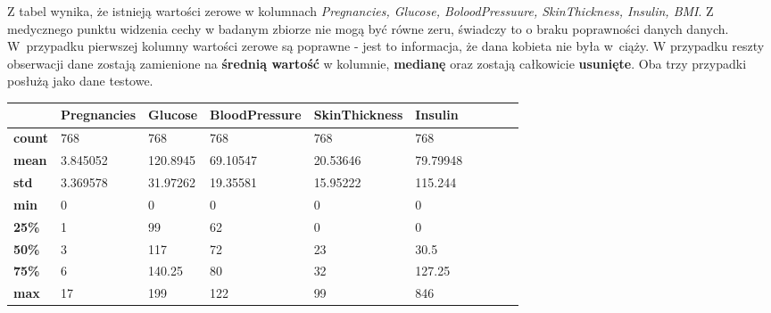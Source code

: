 \documentclass[12pt]{article}
\begin{document}
Z tabel wynika, że istnieją wartości zerowe w kolumnach \textit{Pregnancies, Glucose, BoloodPressuure, SkinThickness, Insulin, BMI}. Z medycznego punktu widzenia cechy w badanym zbiorze nie mogą być równe zeru, świadczy to o braku poprawności danych danych. W~przypadku pierwszej kolumny wartości zerowe są poprawne - jest to informacja, że dana kobieta nie była w~ciąży. W przypadku reszty obserwacji dane zostają zamienione na \textbf{średnią wartość} w kolumnie, \textbf{medianę} oraz zostają całkowicie \textbf{usunięte}. Oba trzy przypadki posłużą jako dane testowe.

\begin{table}[]
\begin{tabular}{@{}llllllllll@{}}
\toprule
               & \textbf{Pregnancies} & \textbf{Glucose} & \textbf{BloodPressure} & \textbf{SkinThickness} & \textbf{Insulin} &  &  &  &  \\ \midrule
\textbf{count} & 768                  & 768              & 768                    & 768                    & 768              &  &  &  &  \\
\textbf{mean}  & 3.845052             & 120.8945         & 69.10547               & 20.53646               & 79.79948         &  &  &  &  \\
\textbf{std}   & 3.369578             & 31.97262         & 19.35581               & 15.95222               & 115.244          &  &  &  &  \\
\textbf{min}   & 0                    & 0                & 0                      & 0                      & 0                &  &  &  &  \\
\textbf{25\%}  & 1                    & 99               & 62                     & 0                      & 0                &  &  &  &  \\
\textbf{50\%}  & 3                    & 117              & 72                     & 23                     & 30.5             &  &  &  &  \\
\textbf{75\%}  & 6                    & 140.25           & 80                     & 32                     & 127.25           &  &  &  &  \\
\textbf{max}   & 17                   & 199              & 122                    & 99                     & 846              &  &  &  &  \\ \bottomrule
\end{tabular}
\end{table}
\end{document}
